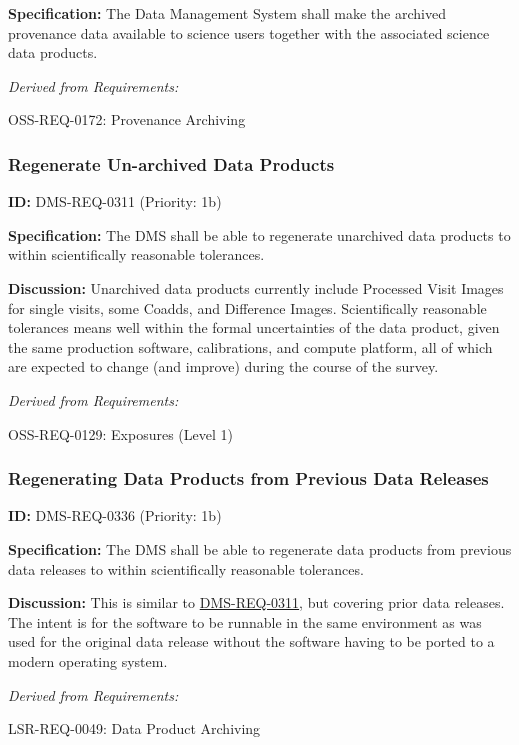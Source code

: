 \documentclass[SE,toc,lsstdraft]{lsstdoc}
\begin{document}
\textbf{Specification:}
The Data Management System shall make the archived provenance data available to science users together with the associated science data products.

\emph{Derived from Requirements:}

OSS-REQ-0172:
Provenance Archiving \newline

\subsubsection{Regenerate Un-archived Data Products}

\label{DMS-REQ-0311}
\textbf{ID:} DMS-REQ-0311 (Priority: 1b)

\textbf{Specification:} The DMS shall be able to regenerate unarchived data products to within scientifically reasonable tolerances.

\textbf{Discussion: }Unarchived data products currently include Processed Visit Images for single visits, some Coadds, and Difference Images. Scientifically reasonable tolerances means well within the formal uncertainties of the data product, given the same production software, calibrations, and compute platform, all of which are expected to change (and improve) during the course of the survey.

\emph{Derived from Requirements:}

OSS-REQ-0129:
Exposures (Level 1) \newline

\subsubsection{Regenerating Data Products from Previous Data Releases}

\label{DMS-REQ-0336}
\textbf{ID:} DMS-REQ-0336 (Priority: 1b)

\textbf{Specification:} The DMS shall be able to regenerate data products from previous data releases to within scientifically reasonable tolerances.

\textbf{Discussion:} This is similar to \hyperref[DMS-REQ-0311]{DMS-REQ-0311}, but covering prior data releases. The intent is for the software to be runnable in the same environment as was used for the original data release without the software having to be ported to a modern operating system.

\emph{Derived from Requirements:}

LSR-REQ-0049:
Data Product Archiving \newline
\end{document}
